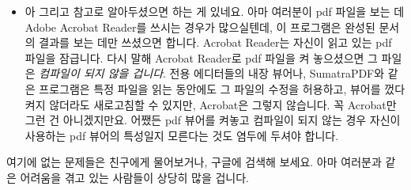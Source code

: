 \begin{itemize}
	\item 아 그리고 참고로 알아두셨으면 하는 게 있네요.
	아마 여러분이 pdf 파일을 보는 데 Adobe Acrobat Reader를 쓰시는 경우가 많으실텐데, 이 프로그램은 완성된 문서의 결과를 보는 데만 쓰셨으면 합니다.
	Acrobat Reader는 자신이 읽고 있는 pdf 파일을 잠급니다.
	다시 말해 Acrobat Reader로 pdf 파일을 켜 놓으셨으면 그 파일은 \emph{컴파일이 되지 않을 겁니다}.
	\lt 전용 에디터들의 내장 뷰어나, SumatraPDF와 같은 프로그램은 특정 파일을 읽는 동안에도 그 파일의 수정을 허용하고, 뷰어를 껐다 켜지 않더라도 새로고침할 수 있지만, Acrobat은 그렇지 않습니다.
	꼭 Acrobat만 그런 건 아니겠지만요.
	어쨌든 pdf 뷰어를 켜놓고 컴파일이 되지 않는 경우 자신이 사용하는 pdf 뷰어의 특성일지 모른다는 것도 염두에 두셔야 합니다.
	
      \end{itemize}
      여기에 없는 문제들은 친구에게 물어보거나, 구글에 검색해 보세요. 아마 여러분과 같은 어려움을 겪고 있는 사람들이 상당히 많을 겁니다.

